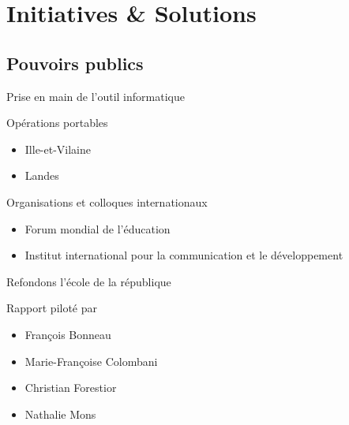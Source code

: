 \section{Initiatives \& Solutions}

\subsection{Pouvoirs publics}

\begin{frame}{Prise en main de l'outil informatique}
\end{frame}

\begin{frame}{Opérations portables}
	  \begin{itemize}
	  \item Ille-et-Vilaine
	  \item Landes
	  \end{itemize}
\end{frame}

\begin{frame}{Organisations et colloques internationaux}
	  \begin{itemize}
	  \item Forum mondial de l'éducation
	  \item Institut international pour la communication et le développement
	  \end{itemize}
\end{frame}

\begin{frame}{Refondons l'école de la république}

\begin{block}{Rapport piloté par}
  \begin{itemize}
  \item François Bonneau
  \item Marie-Françoise Colombani
  \item Christian Forestior
  \item Nathalie Mons
  \end{itemize}
\end{block}

\end{frame}


